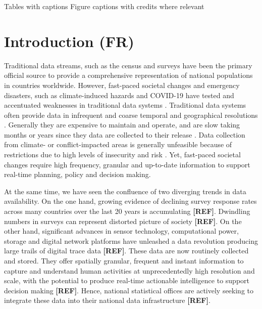 \documentclass[]{rsos}%
\begin{document}
Tables with captions Figure captions with credits where relevant

\newpage

\section{Introduction (FR)}\label{introduction-fr}

Traditional data streams, such as the census and surveys have been the
primary official source to provide a comprehensive representation of
national populations in countries worldwide. However, fast-paced
societal changes and emergency disasters, such as climate-induced
hazards and COVID-19 have tested and accentuated weaknesses in
traditional data systems \citep{green2021}. Traditional data systems often
provide data in infrequent and coarse temporal and geographical
resolutions \citep{rowe23-bigdata}. Generally they are expensive to maintain
and operate, and are slow taking months or years since they data are
collected to their release \citep{rowe23-bigdata}. Data collection from
climate- or conflict-impacted areas is generally unfeasible because of
restrictions due to high levels of insecurity and risk
\citep{iradukunda2025}. Yet, fast-paced societal changes require high
frequency, granular and up-to-date information to support real-time
planning, policy and decision making.

At the same time, we have seen the confluence of two diverging trends in
data availability. On the one hand, growing evidence of declining survey
response rates across many countries over the last 20 years is
accumulating \textbf{{[}REF{]}}. Dwindling numbers in surveys can represent
distorted picture of society \textbf{{[}REF{]}}. On the other hand, significant
advances in sensor technology, computational power, storage and digital
network platforms have unleashed a data revolution producing large
trails of digital trace data \textbf{{[}REF{]}}. These data are now routinely
collected and stored. They offer spatially granular, frequent and
instant information to capture and understand human activities at
unprecedentedly high resolution and scale, with the potential to produce
real-time actionable intelligence to support decision making \textbf{{[}REF{]}}.
Hence, national statistical offices are actively seeking to integrate
these data into their national data infrastructure \textbf{{[}REF{]}}.
\end{document}
